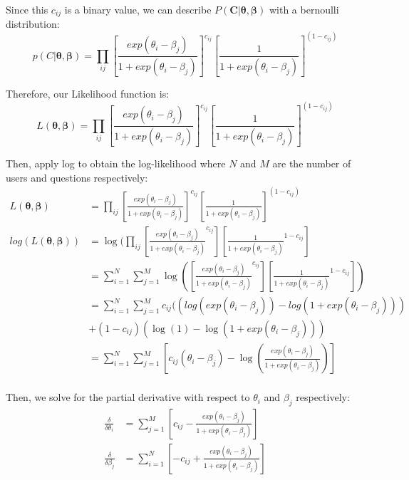\documentclass{article}
\begin{document}
    Since this $c_{ij}$ is a binary value, we can describe $P(\bm{C} \vert \bm{\theta}, \bm{\beta})$ with a bernoulli distribution:
    \[p(C \vert \bm{\theta}, \bm{\beta}) = \prod_{ij}[\frac{exp(\theta_{i} - \beta_{j})}{1+exp(\theta_{i} - \beta_{j})}]^{c_{ij}}[\frac{1}{1 + exp(\theta_{i} - \beta_{j})}]^{(1-c_{ij})}\]

    Therefore, our Likelihood function is:
    \[L(\bm{\theta}, \bm{\beta}) =\prod_{ij}[\frac{exp(\theta_{i} - \beta_{j})}{1+exp(\theta_{i} - \beta_{j})}]^{c_{ij}}[\frac{1}{1 + exp(\theta_{i} - \beta_{j})}]^{(1-c_{ij})}\]

    Then, apply log to obtain the log-likelihood where $N$ and $M$ are the number of users and questions respectively:
    \begin{align*}
        L(\bm{\theta}, \bm{\beta}) &=\prod_{ij}[\frac{exp(\theta_{i} - \beta_{j})}{1+exp(\theta_{i} - \beta_{j})}]^{c_{ij}}[\frac{1}{1 + exp(\theta_{i} - \beta_{j})}]^{(1-c_{ij})} \\
        log(L(\bm{\theta}, \bm{\beta})) &= \log(\prod_{ij}[\frac{exp(\theta_{i} - \beta_{j})}{1+exp(\theta_{i} - \beta_{j})}^{c_{ij}}][\frac{1}{1 + exp(\theta_{i} - \beta_{j})}^{1-c_{ij}}] \\
        &=\sum_{i=1}^{N} \sum_{j=1}^{M} \log([\frac{exp(\theta_{i} - \beta_{j})}{1+exp(\theta_{i} - \beta_{j})}^{c_{ij}}][\frac{1}{1 + exp(\theta_{i} - \beta_{j})}^{1-c_{ij}}]) \\
        &=\sum_{i=1}^{N} \sum_{j=1}^{M} c_{ij}((log(exp(\theta_{i} - \beta_{j})) - log(1 + exp(\theta_{i} - \beta_{j}))) \\
        &+ (1 - c_{ij})(\log(1) - \log(1 + exp(\theta_{i} - \beta_{j}))) \\
        &=\sum_{i=1}^{N} \sum_{j=1}^{M} [c_{ij}(\theta_{i} - \beta_{j}) - \log(\frac{exp(\theta_{i} - \beta_{j})}{1+exp(\theta_{i} - \beta_{j})})] \\
    \end{align*}

    Then, we solve for the partial derivative with respect to $\theta_i$ and $\beta_j$ respectively:
    \begin{align*}
        \frac{\delta}{\delta\theta_{i}} &=  \sum_{j=1}^{M}{[c_{ij} - \frac{exp(\theta_{i} - \beta_{j})}{1+exp(\theta_{i} - \beta_{j})}]} \\
        \frac{\delta}{\delta\beta_{j}} &= \sum_{i=1}^{N}{[-c_{ij} + \frac{exp(\theta_{i} - \beta_{j})}{1+exp(\theta_{i} - \beta_{j})}]}
    \end{align*}
    
\end{document}
